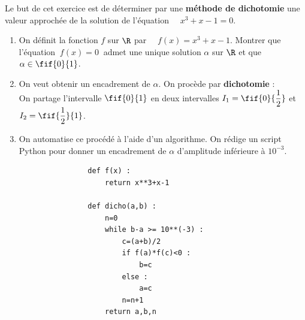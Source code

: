 \documentclass[a4paper,11pt,exos]{nsi} %
\begin{document}
Le but de cet exercice est de déterminer par une \textbf{méthode de dichotomie} une valeur approchée de la solution de l'équation $\quad x^3+x-1=0$.
\begin{enumerate}
	\item On définit la fonction $f$ sur $\R$ par $\quad f(x)=x^3+x-1$.
	Montrer que l'équation $\ f(x)=0\ $ admet une unique solution $\alpha$ sur $\R$ et que $\alpha\in\fif{0}{1}$.
	\item On veut obtenir un encadrement de $\alpha$. On procède par \textbf{dichotomie} :\\
	On partage l'intervalle $\fif{0}{1}$ en deux intervalles $I_1=\fif{0}{\dfrac{1}{2}}$ et $I_2=\fif{\dfrac{1}{2}}{1}$.
	\item On automatise ce procédé à l'aide d'un algorithme. On rédige un script Python pour donner un encadrement de $\alpha$ d'amplitude inférieure à $10^{-3}$.
	\begin{multicols}{2}
		\begin{pyc}
			\begin{verbatim}
				def f(x) :
					return x**3+x-1
				
				def dicho(a,b) :
					n=0
					while b-a >= 10**(-3) :
						c=(a+b)/2
						if f(a)*f(c)<0 :
							b=c
						else :
							a=c
						n=n+1
					return a,b,n
			\end{verbatim}
		\end{pyc}


\end{multicols}
\end{enumerate}
\end{document}
